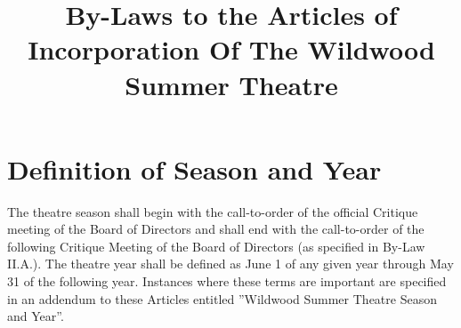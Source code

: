 \documentclass{wst}
\title{By-Laws to the Articles of Incorporation Of The Wildwood Summer Theatre}
\begin{document}
\maketitle

\section{Definition of Season and Year}
\begin{outline}[enumerate]
\1 The theatre season shall begin with the call-to-order of the official Critique meeting of the Board of Directors and shall end with the call-to-order of the following Critique Meeting of the Board of Directors (as specified in By-Law II.A.).
\1 The theatre year shall be defined as June 1 of any given year through May 31 of the following year.
\1 Instances where these terms are important are specified in an addendum to these Articles entitled ''Wildwood Summer Theatre Season and Year''.


\end{outline}
\end{document}
